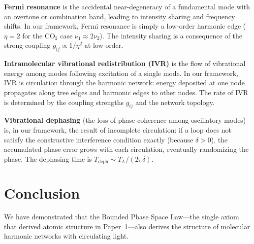 \documentclass[11pt,a4paper]{article}
\theoremstyle{definition}
\theoremstyle{remark}
\begin{document}
\textbf{Fermi resonance} \citep{fermi1931} is the accidental near-degeneracy of a fundamental mode with an overtone or combination band, leading to intensity sharing and frequency shifts. In our framework, Fermi resonance is simply a low-order harmonic edge ($\eta = 2$ for the CO$_2$ case $\nu_1 \approx 2\nu_2$). The intensity sharing is a consequence of the strong coupling $g_{ij} \propto 1/\eta^2$ at low order.

\textbf{Intramolecular vibrational redistribution (IVR)} is the flow of vibrational energy among modes following excitation of a single mode. In our framework, IVR is circulation through the harmonic network: energy deposited at one node propagates along tree edges and harmonic edges to other nodes. The rate of IVR is determined by the coupling strengths $g_{ij}$ and the network topology.

\textbf{Vibrational dephasing} (the loss of phase coherence among oscillatory modes) is, in our framework, the result of incomplete circulation: if a loop does not satisfy the constructive interference condition exactly (because $\delta > 0$), the accumulated phase error grows with each circulation, eventually randomizing the phase. The dephasing time is $T_{\mathrm{deph}} \sim T_L / (2\pi \delta)$.

\section{Conclusion}
\label{sec:conclusion}

We have demonstrated that the Bounded Phase Space Law---the single axiom that derived atomic structure in Paper~1---also derives the structure of molecular harmonic networks with circulating light.
\end{document}
